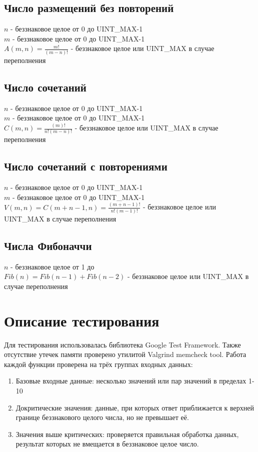 \documentclass[zuev-report.tex]{subfiles}
\begin{document}
\subsection{Число размещений без повторений}
\txtIn
$n$ - беззнаковое целое от 0 до UINT\_MAX-1\\
$m$ - беззнаковое целое от 0 до UINT\_MAX-1\\
\txtOut
$A(m,n)=\frac{m!}{(m−n)!}$ - беззнаковое целое или UINT\_MAX в случае переполнения\\
\txtTxt
\label{perm_no_repet}

\subsection{Число сочетаний}
\txtIn
$n$ - беззнаковое целое от 0 до UINT\_MAX-1\\
$m$ - беззнаковое целое от 0 до UINT\_MAX-1\\
\txtOut
$C(m,n)=\frac{(m)!}{n!(m−n)!}$ - беззнаковое целое или UINT\_MAX в случае переполнения\\
\txtTxt
\label{binomial}

\subsection{Число сочетаний с повторениями}
\txtIn
$n$ - беззнаковое целое от 0 до UINT\_MAX-1\\
$m$ - беззнаковое целое от 0 до UINT\_MAX-1\\
\txtOut
$V(m,n)=C(m+n−1,n)=\frac{(m+n−1)!}{n!(m−1)!}$ - беззнаковое целое или UINT\_MAX в случае переполнения\\
\txtTxt
\label{vmn}

\subsection{Числа Фибоначчи}
\txtIn
$n$ - беззнаковое целое от 1 до \\ %
\txtOut
$Fib(n)=Fib(n-1)+Fib(n-2)$ - беззнаковое целое или UINT\_MAX в случае переполнения\\
\txtTxt
\label{fib}

\section{Описание тестирования}
Для тестирования использовалась библиотека Google Test Framework. Также отсутствие утечек памяти проверено утилитой Valgrind memcheck tool. 
Работа каждой функции проверена на трёх группах входных данных:
\begin{enumerate}
	\item{} Базовые входные данные: несколько значений или пар значений в пределах 1-10
	\item{} Докритические значения: данные, при которых ответ приближается к верхней границе беззнакового целого числа, но не превышает её.
	\item{} Значения выше критических: проверяется правильная обработка данных, результат которых не вмещается в беззнаковое целое число.
\end{enumerate}
\end{document}
